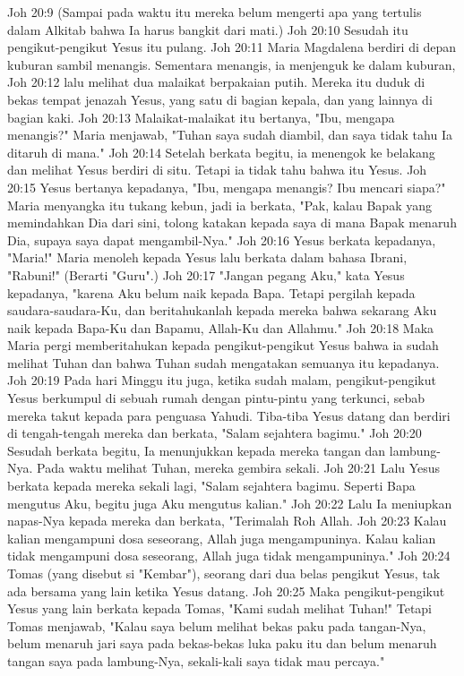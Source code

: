 Joh 20:9  (Sampai pada waktu itu mereka belum mengerti apa yang tertulis dalam Alkitab bahwa Ia harus bangkit dari mati.)
Joh 20:10  Sesudah itu pengikut-pengikut Yesus itu pulang.
Joh 20:11  Maria Magdalena berdiri di depan kuburan sambil menangis. Sementara menangis, ia menjenguk ke dalam kuburan,
Joh 20:12  lalu melihat dua malaikat berpakaian putih. Mereka itu duduk di bekas tempat jenazah Yesus, yang satu di bagian kepala, dan yang lainnya di bagian kaki.
Joh 20:13  Malaikat-malaikat itu bertanya, "Ibu, mengapa menangis?" Maria menjawab, "Tuhan saya sudah diambil, dan saya tidak tahu Ia ditaruh di mana."
Joh 20:14  Setelah berkata begitu, ia menengok ke belakang dan melihat Yesus berdiri di situ. Tetapi ia tidak tahu bahwa itu Yesus.
Joh 20:15  Yesus bertanya kepadanya, "Ibu, mengapa menangis? Ibu mencari siapa?" Maria menyangka itu tukang kebun, jadi ia berkata, "Pak, kalau Bapak yang memindahkan Dia dari sini, tolong katakan kepada saya di mana Bapak menaruh Dia, supaya saya dapat mengambil-Nya."
Joh 20:16  Yesus berkata kepadanya, "Maria!" Maria menoleh kepada Yesus lalu berkata dalam bahasa Ibrani, "Rabuni!" (Berarti "Guru".)
Joh 20:17  "Jangan pegang Aku," kata Yesus kepadanya, "karena Aku belum naik kepada Bapa. Tetapi pergilah kepada saudara-saudara-Ku, dan beritahukanlah kepada mereka bahwa sekarang Aku naik kepada Bapa-Ku dan Bapamu, Allah-Ku dan Allahmu."
Joh 20:18  Maka Maria pergi memberitahukan kepada pengikut-pengikut Yesus bahwa ia sudah melihat Tuhan dan bahwa Tuhan sudah mengatakan semuanya itu kepadanya.
Joh 20:19  Pada hari Minggu itu juga, ketika sudah malam, pengikut-pengikut Yesus berkumpul di sebuah rumah dengan pintu-pintu yang terkunci, sebab mereka takut kepada para penguasa Yahudi. Tiba-tiba Yesus datang dan berdiri di tengah-tengah mereka dan berkata, "Salam sejahtera bagimu."
Joh 20:20  Sesudah berkata begitu, Ia menunjukkan kepada mereka tangan dan lambung-Nya. Pada waktu melihat Tuhan, mereka gembira sekali.
Joh 20:21  Lalu Yesus berkata kepada mereka sekali lagi, "Salam sejahtera bagimu. Seperti Bapa mengutus Aku, begitu juga Aku mengutus kalian."
Joh 20:22  Lalu Ia meniupkan napas-Nya kepada mereka dan berkata, "Terimalah Roh Allah.
Joh 20:23  Kalau kalian mengampuni dosa seseorang, Allah juga mengampuninya. Kalau kalian tidak mengampuni dosa seseorang, Allah juga tidak mengampuninya."
Joh 20:24  Tomas (yang disebut si "Kembar"), seorang dari dua belas pengikut Yesus, tak ada bersama yang lain ketika Yesus datang.
Joh 20:25  Maka pengikut-pengikut Yesus yang lain berkata kepada Tomas, "Kami sudah melihat Tuhan!" Tetapi Tomas menjawab, "Kalau saya belum melihat bekas paku pada tangan-Nya, belum menaruh jari saya pada bekas-bekas luka paku itu dan belum menaruh tangan saya pada lambung-Nya, sekali-kali saya tidak mau percaya."
